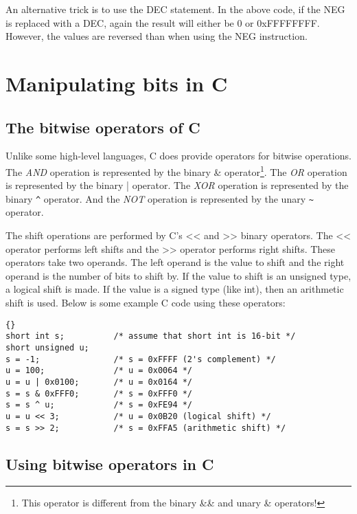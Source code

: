 An alternative trick is to use the {\code DEC} statement. In the above
code, if the {\code NEG} is replaced with a {\code DEC}, again the result
will either be 0 or 0xFFFFFFFF. However, the values are reversed than
when using the {\code NEG} instruction.


\section{Manipulating bits in C}

\subsection{The bitwise operators of C}

Unlike some high-level languages, C does provide operators for bitwise
operations. The \emph{AND} operation is represented by the binary
{\code \&} operator\footnote{This operator is different from the
binary {\code \&\&} and unary {\code \&} operators!}. The \emph{OR}
operation is represented by the binary {\code |} operator. The
\emph{XOR} operation is represented by the binary {\code \verb|^| 
}operator. And the \emph{NOT} operation is represented by the unary
{\code \verb|~| }operator.

The shift operations are performed by C's {\code <<} and {\code >>}
binary operators. The {\code <<} operator performs left shifts and the 
{\code >>} operator performs right shifts. These operators take two
operands. The left operand is the value to shift and the right operand is
the number of bits to shift by. If the value to shift is an unsigned type,
a logical shift is made. If the value is a signed type (like {\code int}),
then an arithmetic shift is used. Below is some example C code using these
operators:
\begin{lstlisting}{}
short int s;          /* assume that short int is 16-bit */
short unsigned u;
s = -1;               /* s = 0xFFFF (2's complement) */
u = 100;              /* u = 0x0064 */
u = u | 0x0100;       /* u = 0x0164 */
s = s & 0xFFF0;       /* s = 0xFFF0 */
s = s ^ u;            /* s = 0xFE94 */
u = u << 3;           /* u = 0x0B20 (logical shift) */
s = s >> 2;           /* s = 0xFFA5 (arithmetic shift) */
\end{lstlisting}

\subsection{Using bitwise operators in C}

